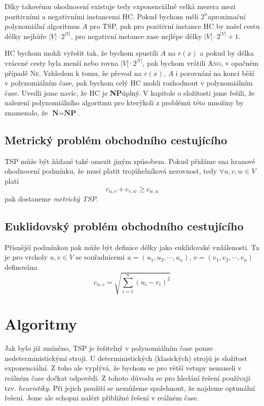 \documentclass[
  biblatex,
  figures=false,
  glossaries,
  index
]{kidiplom}
\begin{document}
Díky takovému ohodnocení existuje tedy exponenciálně velká mezera mezi pozitivními a negativními instancemi HC. Pokud bychom měli $2^n$\textendash aproximační polynomiální algoritmus $A$ pro TSP, pak pro pozitivní instance HC by našel cestu délky nejhůře $|V|\cdot2^{|V|}$, pro negativní instance zase nejlépe délky $|V|\cdot2^{|V|} + 1$.

HC bychom mohli vyřešit tak, že bychom spustili $A$ na $r(x)$ a pokud by délka vrácené cesty byla menší nebo rovna $|V|\cdot2^{|V|}$, pak bychom vrátili \textsc{Ano}, v opačném případě \textsc{Ne}. Vzhledem k tomu, že převod na $r(x)$, $A$ i porovnání na konci běží v polynomiálním čase, pak bychom celý HC mohli rozhodnout v polynomiálním čase. Uvedli jsme navíc, že HC je \textbf{NP}\textendash úplný. V kapitole o složitosti jsme řešili, že nalezení polynomiálního algoritmu pro kterýkoli z problémů této množiny by znamenalo, že $\textbf{N} = \textbf{NP}$.

\subsection{Metrický problém obchodního cestujícího}
TSP může být žádané také omezit jiným způsobem. Pokud přidáme sna hranové ohodnocení podmínku, že musí platit trojúhelníková nerovnost, tedy $\forall u, v, w \in V$ platí $$c_{u, v} + c_{v, w} \ge c_{w, u}$$
pak dostaneme \textit{metrický TSP}.

\subsection{Euklidovský problém obchodního cestujícího}
Přísnější podmínkou pak může být definice délky jako euklidovské vzdálenosti. Ta je pro vrcholy $u, v \in V$ se souřadnicemi $u = (u_1, u_2, \cdots, u_n)$, $v = (v_1, v_2, \cdots, v_n)$ definována
$$
c_{u, v} = \sqrt{\sum_{i=1}^{n} (u_i - v_i)^2}
$$
\pagebreak
\section{Algoritmy}
Jak bylo již zmíněno, TSP je řešitelný v polynomiálním čase pouze nedeterministickými stroji. U deterministických (klasických) strojů je složitost exponenciální. Z toho ale vyplývá, že bychom se pro větší vstupy nemuseli v reálném čase dočkat odpovědi. Z tohoto důvodu se pro hledání řešení používají tzv. \textit{heuristiky}. Při jejich použití se nemůžeme spolehnout, že najdeme optimální řešení. Jsme ale schopni nalézt přibližné řešení v reálném čase.
\end{document}
